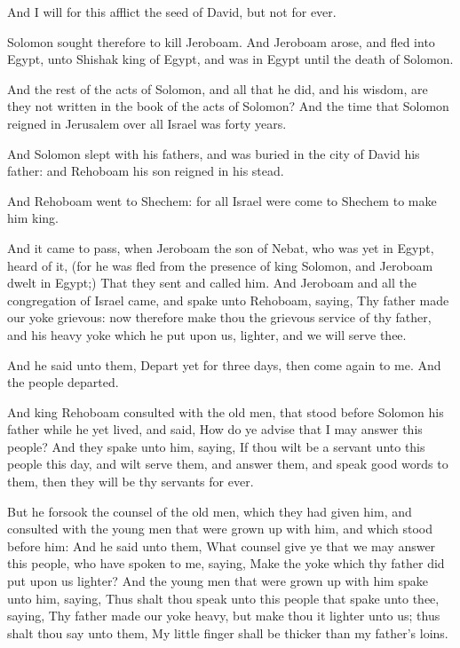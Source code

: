 \Verse And I will for this afflict the seed of David, but not for ever.

\Verse Solomon sought therefore to kill Jeroboam. And Jeroboam arose, and fled into Egypt, unto Shishak king of Egypt, and was in Egypt until the death of Solomon.

\Verse And the rest of the acts of Solomon, and all that he did, and his wisdom, are they not written in the book of the acts of Solomon?  \Verse And the time that Solomon reigned in Jerusalem over all Israel was forty years.

\Verse And Solomon slept with his fathers, and was buried in the city of David his father: and Rehoboam his son reigned in his stead.


\Chapter
\Verse And Rehoboam went to Shechem: for all Israel were come to Shechem to make him king.

\Verse And it came to pass, when Jeroboam the son of Nebat, who was yet in Egypt, heard of it, (for he was fled from the presence of king Solomon, and Jeroboam dwelt in Egypt;) \Verse That they sent and called him. And Jeroboam and all the congregation of Israel came, and spake unto Rehoboam, saying, \Verse Thy father made our yoke grievous: now therefore make thou the grievous service of thy father, and his heavy yoke which he put upon us, lighter, and we will serve thee.

\Verse And he said unto them, Depart yet for three days, then come again to me. And the people departed.

\Verse And king Rehoboam consulted with the old men, that stood before Solomon his father while he yet lived, and said, How do ye advise that I may answer this people?  \Verse And they spake unto him, saying, If thou wilt be a servant unto this people this day, and wilt serve them, and answer them, and speak good words to them, then they will be thy servants for ever.

\Verse But he forsook the counsel of the old men, which they had given him, and consulted with the young men that were grown up with him, and which stood before him: \Verse And he said unto them, What counsel give ye that we may answer this people, who have spoken to me, saying, Make the yoke which thy father did put upon us lighter?  \Verse And the young men that were grown up with him spake unto him, saying, Thus shalt thou speak unto this people that spake unto thee, saying, Thy father made our yoke heavy, but make thou it lighter unto us; thus shalt thou say unto them, My little finger shall be thicker than my father's loins.

